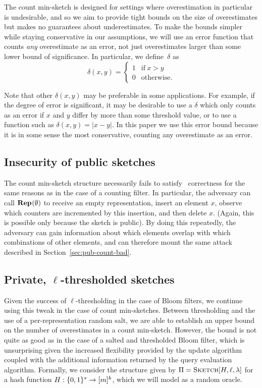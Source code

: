 %
The count min-sketch is designed for settings where overestimation in particular
is undesirable, and so we aim to provide tight bounds on the size of
overestimates but makes no guarantees about underestimates. To make the bounds
simpler while staying conservative in our assumptions, we will use an error
function that counts \emph{any} overestimate as an error, not just overestimates
larger than some lower bound of significance. In particular, we define~$\delta$
as
%
\begin{equation}
  \delta(x, y) =
  \begin{cases}
    1 & \text{if}\ x > y \\
    0 & \text{otherwise.}
  \end{cases}
\end{equation}

Note that other $\delta(x,y)$ may be preferable in some applications. For
example, if the degree of error is significant, it may be desirable to use a $\delta$
which only counts as an error if $x$ and $y$ differ by more than some threshold value,
or to use a function such as $\delta(x,y) = |x-y|$. In this paper we use this
error bound because it is in some sense the most conservative, counting any
overestimate as an error.

\subsection{Insecurity of public sketches}

The count min-sketch structure necessarily fails to satisfy \errep\
correctness for the same reasons as in the case of a counting filter. In
particular, the adversary can call $\textup{\textbf{Rep}}\hspace{0.5pt}(\emptyset)$ to receive an empty
representation, insert an element $x$, observe which counters are incremented by
this insertion, and then delete $x$. (Again, this is possible only because the
sketch is public). By doing this repeatedly, the adversary can
gain information about which elements overlap with which combinations of other
elements, and can therefore mount the same attack described in
Section~\ref{sec:pub-count-bad}.

\subsection{Private, $\ell$-thresholded sketches}
\label{sec:sketch-proof}

Given the success of $\ell$-thresholding in the case of Bloom filters, we
continue using this tweak in the case of count min-sketches. Between
thresholding and the use of a per-representation random salt, we are able to
establish an upper bound on the number of overestimates in a count min-sketch.
However, the bound is not quite as good as in the case of a salted and
thresholded Bloom filter, which is unsurprising given the increased flexibility
provided by the update algorithm coupled with the additional
information returned by the query evaluation algorithm.
%
Formally, we consider the structure given by $\Pi = \textnormal{\textsc{Sketch}}[H,\ell,\lambda]$ for
a hash function $H: \{0,1\}^* \to [m]^k$, which we will model as a random oracle.


